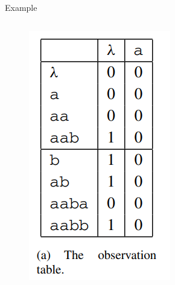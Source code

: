\documentclass[aspectratio=169,xcolor=dvipsnames]{beamer}
\begin{document}
\begin{frame}[t]{Example}
\begin{columns}
    \begin{figure}
        \centering
        \includegraphics[width=1\linewidth]{images/fig13_3a.png}
    \end{figure}


\end{columns}
\end{frame}
\end{document}
